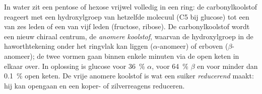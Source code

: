 \begin{proposition}\label{prop:b1:carbohydrates:rings}
In water zit een pentose of hexose vrijwel volledig in een ring: de
carbonylkoolstof reageert met een hydroxylgroep van hetzelfde molecuul (C5 bij
glucose) tot een \emph{} van zes leden of een \emph{} van
vijf leden (fructose, ribose). De carbonylkoolstof wordt een nieuw chiraal
centrum, de \emph{anomere koolstof}, waarvan de hydroxylgroep in de
haworthtekening onder het ringvlak kan liggen ($\alpha$-anomeer) of erboven
($\beta$-anomeer); de twee vormen gaan binnen enkele minuten via de open keten in
elkaar over. In oplossing is glucose voor \qty{36}{\%} $\alpha$, voor
\qty{64}{\%} $\beta$ en voor minder dan \qty{0.1}{\%} open keten. De vrije anomere
koolstof is wat een suiker \emph{reducerend} maakt: hij kan opengaan en een
koper- of zilverreagens reduceren.
\end{proposition}

